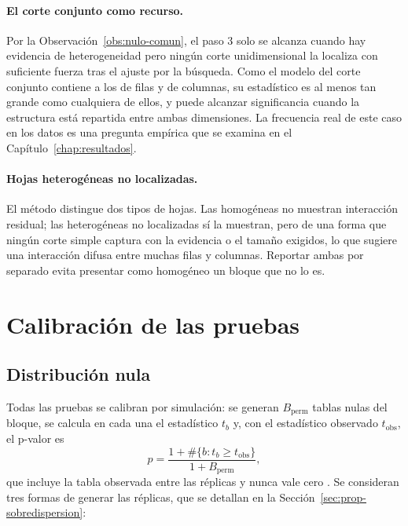 \paragraph{El corte conjunto como recurso.} Por la
Observación~\ref{obs:nulo-comun}, el paso 3 solo se alcanza cuando hay
evidencia de heterogeneidad pero ningún corte unidimensional la localiza con
suficiente fuerza tras el ajuste por la búsqueda. Como el modelo del corte
conjunto contiene a los de filas y de columnas, su estadístico es al menos tan
grande como cualquiera de ellos, y puede alcanzar significancia cuando la
estructura está repartida entre ambas dimensiones. La frecuencia real de este
caso en los datos es una pregunta empírica que se examina en el
Capítulo~\ref{chap:resultados}.

\paragraph{Hojas heterogéneas no localizadas.} El método distingue dos tipos
de hojas. Las homogéneas no muestran interacción residual; las heterogéneas no
localizadas sí la muestran, pero de una forma que ningún corte simple captura
con la evidencia o el tamaño exigidos, lo que sugiere una interacción difusa
entre muchas filas y columnas. Reportar ambas por separado evita presentar como
homogéneo un bloque que no lo es.

\section{Calibración de las pruebas}\label{sec:prop-calibracion}

\subsection{Distribución nula}

Todas las pruebas se calibran por simulación: se generan $B_{\mathrm{perm}}$
tablas nulas del bloque, se calcula en cada una el estadístico $t_b$ y, con el
estadístico observado $t_{\mathrm{obs}}$, el p-valor es
\begin{equation}\label{eq:prop-pval}
  p = \frac{1 + \#\{b : t_b \ge t_{\mathrm{obs}}\}}{1 + B_{\mathrm{perm}}},
\end{equation}
que incluye la tabla observada entre las réplicas y nunca vale cero
\cite{Phipson2010}. Se consideran tres formas de generar las réplicas, que se
detallan en la Sección~\ref{sec:prop-sobredispersion}:

